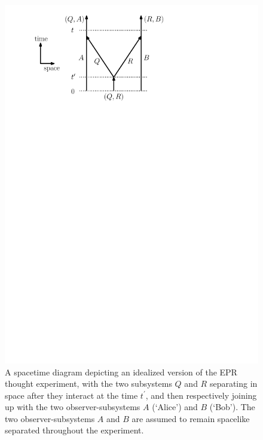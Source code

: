 \documentclass[12pt,english,prl,superscriptaddress,nobibnotes,nofootinbib]{revtex4-2}
\begin{document}
\begin{figure}

\includegraphics[scale=0.6]{EPRExperimentSpacetimeDiagram.pdf}\caption{\label{fig:EPRExperimentSpacetimeDiagram}A spacetime diagram depicting
an idealized version of the EPR thought experiment, with the two subsystems
$Q$ and $R$ separating in space after they interact at the time
$t^{\prime}$, and then respectively joining up with the two observer-subsystems
$A$ (\textquoteleft Alice\textquoteright ) and $B$ (\textquoteleft Bob\textquoteright ).
The two observer-subsystems $A$ and $B$ are assumed to remain spacelike
separated throughout the experiment.}

\end{figure}
\end{document}
